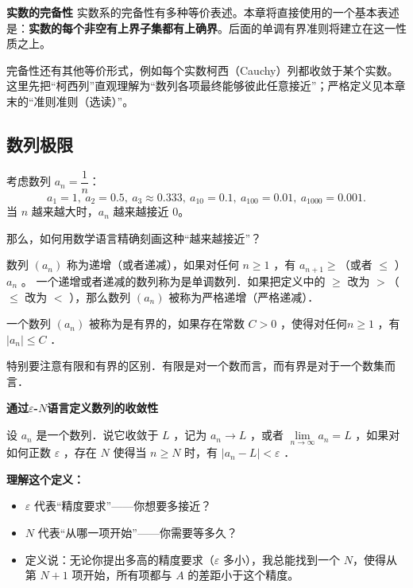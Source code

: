 \documentclass[fontset=fandol]{ctexart}
\newenvironment{custom}[1]{\par\noindent\textbf{#1}\quad}{\par\vspace{0.8em}}
\begin{document}
\begin{custom}{实数的完备性}
实数系的完备性有多种等价表述。本章将直接使用的一个基本表述是：\textbf{实数的每个非空有上界子集都有上确界}。后面的单调有界准则将建立在这一性质之上。

完备性还有其他等价形式，例如每个实数柯西（Cauchy）列都收敛于某个实数。这里先把“柯西列”直观理解为“数列各项最终能够彼此任意接近”；严格定义见本章末的“准则准则（选读）”。
\end{custom}

\fi


\subsection{数列极限}

考虑数列 \(a_n = \dfrac{1}{n}\)：
\[
a_1=1,\ a_2=0.5,\ a_3\approx 0.333,\ a_{10}=0.1,\ a_{100}=0.01,\ a_{1000}=0.001.
\]
当 \(n\) 越来越大时，\(a_n\) 越来越接近 0。

那么，如何用数学语言精确刻画这种“越来越接近”？

\begin{definition}[数列单调性]
	数列 $\left(a_n\right)$ 称为递增（或者递减），如果对任何 $n \geqslant 1$ ，有 $a_{n+1} \geqslant$（或者 $\leqslant$ ）$a_n$ 。
	一个递增或者递减的数列称为是单调数列．如果把定义中的 $\geqslant$ 改为 $>$（ $\leqslant$ 改为 $<$ ），那么数列 $\left(a_n\right)$ 被称为严格递增（严格递减）．
\end{definition}

\begin{definition}[数列有界性]
	 一个数列 $\left(a_n\right)$ 被称为是有界的，如果存在常数 $C>0$ ，使得对任何$n \geqslant 1$ ，有 $\left|a_n\right| \leqslant C$ ．
\end{definition}



特别要注意有限和有界的区别．有限是对一个数而言，而有界是对于一个数集而言．


\textbf{通过\texorpdfstring{\(\varepsilon\)-\(N\)语言定义数列的收敛性}{epsilon-N 定义}}




\begin{definition}[数列极限]
设 $a_n$ 是一个数列．说它收敛于 $L$ ，记为 $a_n \rightarrow L$ ，或者 $\lim \limits_{n \to \infty} a_n=L$ ，如果对如何正数 $\varepsilon$ ，存在 $N$ 使得当 $n \geqslant N$ 时，有 $\left|a_n-L\right|<\varepsilon$ ．
\end{definition}


\iffalse
\textbf{理解这个定义：}
\begin{itemize}
\item \(\varepsilon\) 代表“精度要求”——你想要多接近？
\item \(N\) 代表“从哪一项开始”——你需要等多久？
\item 定义说：无论你提出多高的精度要求（\(\varepsilon\) 多小），我总能找到一个 \(N\)，使得从第 \(N+1\) 项开始，所有项都与 \(A\) 的差距小于这个精度。
\end{itemize}
\end{document}
